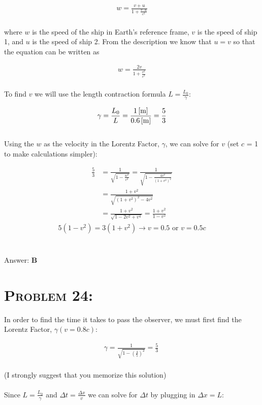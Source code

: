 \documentclass{article}
\begin{document}
\begin{align}
w = \frac{v + u}{1+\frac{v \cdot u}{c^{2}}}
\end{align}
\\
where $w$ is the speed of the ship in Earth's reference frame, $v$ is the speed of ship 1, and $u$ is the speed of ship 2. From the description we know that $u = v$ so that the equation can be written as

\begin{align}
w = \frac{2v}{1+\frac{v^2}{c^{2}}}\nonumber
\end{align}
\\
To find $v$ we will use the length contraction formula $L = \frac{L_{0}}{\gamma}$:

\begin{align}
\gamma = \frac{L_{0}}{L} = \frac{\unit[1]{[m]}}{\unit[0.6]{[m]}} = \frac{5}{3}\nonumber
\end{align}
\\
Using the $w$ as the velocity in the Lorentz Factor, $\gamma$, we can solve for $v$ (set $c$ = 1 to make calculations simpler):

\begin{align}
\frac{5}{3} &= \frac{1}{\sqrt{1- \frac{w^2}{c^{2}}}} = \frac{1}{\sqrt{1- \frac{4v^{2}}{(1+v^{2})^{2}}}}\nonumber\\
&= \frac{1+v^{2}}{\sqrt{(1+v^{2})^2 - 4v^{2}}}\nonumber\\
&= \frac{1+v^{2}}{\sqrt{1-2v^2+v^4}} = \frac{1+v^{2}}{1-v^2}\nonumber
\end{align}
\begin{align}
5(1-v^2) = 3(1+v^2) \rightarrow v = 0.5 \text{ or } \boxed{v = 0.5 c}\nonumber
\end{align}
\\\\
Answer: \textbf{\textcolor{ProcessBlue}B}\\


\section{\textsc{Problem 24:}} In order to find the time it takes to pass the observer, we must first find the Lorentz Factor, $\gamma (v = 0.8c)$:

\begin{align}
\gamma = \frac{1}{\sqrt{1- \left(\frac{4}{5}\right)^2}}= \frac{5}{3}\
\end{align}
\\
 (I strongly suggest that you memorize this solution) \\
 \\
Since $L = \frac{L_{0}}{\gamma}$ and $\Delta t = \frac{\Delta x}{v}$ we can solve for $\Delta t$ by plugging in $\Delta x = L$:
\end{document}
